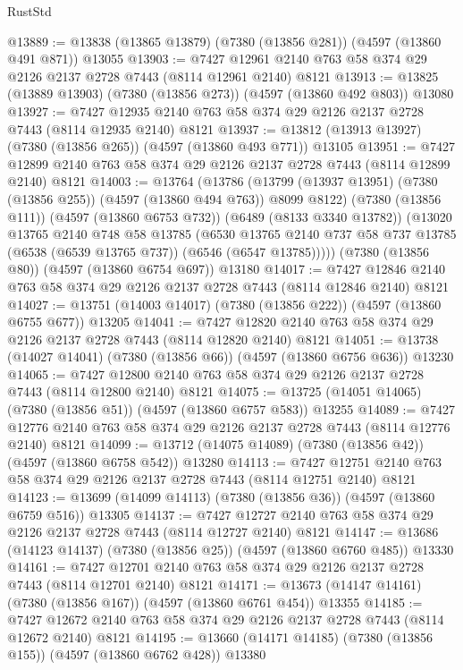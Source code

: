 \begin{lexlean}{RustStd}
\begin{coremodule}
@13889 := @13838 (@13865 @13879) (@7380 (@13856 @281)) (@4597 (@13860 @491 @871)) @13055
@13903 := @7427 @12961 @2140 @763 @58 @374 @29 @2126 @2137 @2728 @7443 (@8114 @12961 @2140) @8121
@13913 := @13825 (@13889 @13903) (@7380 (@13856 @273)) (@4597 (@13860 @492 @803)) @13080
@13927 := @7427 @12935 @2140 @763 @58 @374 @29 @2126 @2137 @2728 @7443 (@8114 @12935 @2140) @8121
@13937 := @13812 (@13913 @13927) (@7380 (@13856 @265)) (@4597 (@13860 @493 @771)) @13105
@13951 := @7427 @12899 @2140 @763 @58 @374 @29 @2126 @2137 @2728 @7443 (@8114 @12899 @2140) @8121
@14003 := @13764
    (@13786
      (@13799 (@13937 @13951) (@7380 (@13856 @255)) (@4597 (@13860 @494 @763)) @8099 @8122)
      (@7380 (@13856 @111))
      (@4597 (@13860 @6753 @732))
      (@6489 (@8133 @3340 @13782))
      (@13020
        @13765
        @2140
        @748
        @58
        @13785
        (@6530
          @13765
          @2140
          @737
          @58
          @737
          @13785
          (@6538 (@6539 @13765 @737))
          (@6546 (@6547 @13785)))))
    (@7380 (@13856 @80))
    (@4597 (@13860 @6754 @697))
    @13180
@14017 := @7427 @12846 @2140 @763 @58 @374 @29 @2126 @2137 @2728 @7443 (@8114 @12846 @2140) @8121
@14027 := @13751 (@14003 @14017) (@7380 (@13856 @222)) (@4597 (@13860 @6755 @677)) @13205
@14041 := @7427 @12820 @2140 @763 @58 @374 @29 @2126 @2137 @2728 @7443 (@8114 @12820 @2140) @8121
@14051 := @13738 (@14027 @14041) (@7380 (@13856 @66)) (@4597 (@13860 @6756 @636)) @13230
@14065 := @7427 @12800 @2140 @763 @58 @374 @29 @2126 @2137 @2728 @7443 (@8114 @12800 @2140) @8121
@14075 := @13725 (@14051 @14065) (@7380 (@13856 @51)) (@4597 (@13860 @6757 @583)) @13255
@14089 := @7427 @12776 @2140 @763 @58 @374 @29 @2126 @2137 @2728 @7443 (@8114 @12776 @2140) @8121
@14099 := @13712 (@14075 @14089) (@7380 (@13856 @42)) (@4597 (@13860 @6758 @542)) @13280
@14113 := @7427 @12751 @2140 @763 @58 @374 @29 @2126 @2137 @2728 @7443 (@8114 @12751 @2140) @8121
@14123 := @13699 (@14099 @14113) (@7380 (@13856 @36)) (@4597 (@13860 @6759 @516)) @13305
@14137 := @7427 @12727 @2140 @763 @58 @374 @29 @2126 @2137 @2728 @7443 (@8114 @12727 @2140) @8121
@14147 := @13686 (@14123 @14137) (@7380 (@13856 @25)) (@4597 (@13860 @6760 @485)) @13330
@14161 := @7427 @12701 @2140 @763 @58 @374 @29 @2126 @2137 @2728 @7443 (@8114 @12701 @2140) @8121
@14171 := @13673 (@14147 @14161) (@7380 (@13856 @167)) (@4597 (@13860 @6761 @454)) @13355
@14185 := @7427 @12672 @2140 @763 @58 @374 @29 @2126 @2137 @2728 @7443 (@8114 @12672 @2140) @8121
@14195 := @13660 (@14171 @14185) (@7380 (@13856 @155)) (@4597 (@13860 @6762 @428)) @13380

\end{coremodule}
\end{lexlean}

